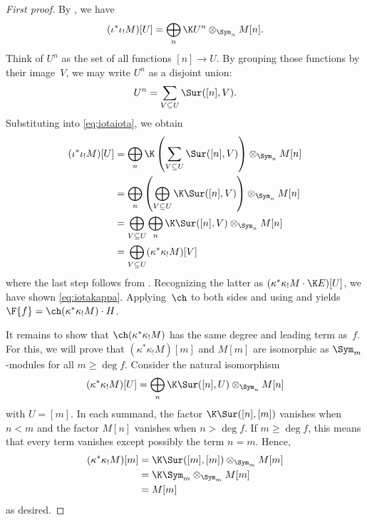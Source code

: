 \begin{proof}[First proof]
By , we have
\begin{equation}\label{eq:iotaiota}
    (\iota^* \iota_! M)[U] = \bigoplus_n \K U^n \otimes_{\Sym_n} M[n].
\end{equation}
Think of $U^n$ as the set of all functions $[n] \to U$. By grouping those functions by their image~$V$, we may write $U^n$ as a disjoint union:
\[U^n = \sum_{V \subseteq U} \Sur([n], V).\]
Substituting into \eqref{eq:iotaiota}, we obtain
\begin{align*}
    (\iota^* \iota_! M)[U] &= \bigoplus_n \K \left(\sum_{V \subseteq U} \Sur([n], V)\right) \otimes_{\Sym_n} M[n] \\
    &= \bigoplus_n \left(\bigoplus_{V \subseteq U} \K\Sur([n], V)\right) \otimes_{\Sym_n} M[n] \\
    &= \bigoplus_{V \subseteq U} \bigoplus_n \K\Sur([n], V) \otimes_{\Sym_n} M[n] \\
    &= \bigoplus_{V \subseteq U} (\kappa^*\kappa_!M)[V]
\end{align*}
where the last step follows from \cite[Proposition~2.6.7]{MR3641124}. Recognizing the latter as $(\kappa^* \kappa_! M \cdot \K E)[U]$, we have shown \eqref{eq:iotakappa}. Applying~$\ch$ to both sides and using  and  yields $\F{f} = \ch(\kappa^* \kappa_!M) \cdot H$.

It remains to show that $\ch(\kappa^* \kappa_!M)$ has the same degree and leading term as~$f$. For this, we will prove that $(\kappa^* \kappa_!M)[m]$ and $M[m]$ are isomorphic as $\Sym_m$-modules for all $m \geq \deg f$. Consider the natural isomorphism \[(\kappa^*\kappa_!M)[U] = \bigoplus_n \K\Sur([n], U) \otimes_{\Sym_n} M[n]\] with $U = [m]$. In each summand, the factor $\K\Sur([n], [m])$ vanishes when $n < m$ and the factor $M[n]$ vanishes when $n > \deg f$. If $m \geq \deg f$, this means that every term vanishes except possibly the term $n = m$. Hence,
\begin{align*}
    (\kappa^*\kappa_!M)[m] &= \K\Sur([m], [m]) \otimes_{\Sym_m} M[m] \\
    &= \K\Sym_m \otimes_{\Sym_m} M[m] \\
    &= M[m]
\end{align*}
as desired.
\end{proof}
